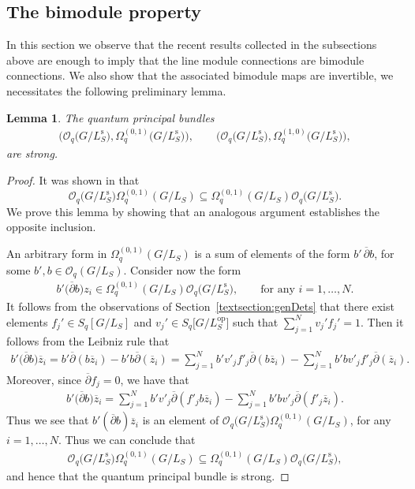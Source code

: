 \documentclass[pdftex]{sigma}
\numberwithin{equation}{section}
\newtheorem{lem}[Theorem]{Lemma}
\newcommand\adel{\overline{\partial}}
\newcommand{\qphs}{\mathcal{O}_q\big(G/L^{\mathrm{s}}_S\big)}
\begin{document}
\subsection{The bimodule property}\label{section3.4}

In this section we observe that the recent results collected in the subsections above are enough to imply that the line module connections are bimodule connections. We also show that the associated bimodule maps are invertible, we necessitates the following preliminary lemma.

\begin{lem}The quantum principal bundles
\begin{gather*}
\big(\mathcal{O}_q\big(G/L_S^{\mathrm{s}}\big),  \Omega^{(0,1)}_q\big(G/L_S^{\mathrm{s}}\big)\big), \qquad \big(\mathcal{O}_q\big(G/L_S^{\mathrm{s}}\big),   \Omega^{(1,0)}_q\big(G/L_S^{\mathrm{s}}\big)\big),
\end{gather*}
are strong.
\end{lem}
\begin{proof}
It was shown in \cite[Lemma 5.7]{CDOBBW} that
\[
\qphs\Omega^{(0,1)}_q(G/L_S) \subseteq \Omega^{(0,1)}_q(G/L_S)\qphs.
\]
We prove this lemma by showing that an analogous argument establishes the opposite inclusion.

An arbitrary form in $\Omega^{(0,1)}_q(G/L_S)$ is a sum of elements of the form $b'\,\adel b$, for some $b',b \in \mathcal{O}_q(G/L_S)$. Consider now the form
\begin{gather*}
b'\big(\adel b\big)z_i \in \Omega^{(0,1)}_q(G/L_S)\qphs , \qquad \textrm{for any } i = 1, \dots, N.
\end{gather*}
It follows from the observations of Section~\ref{textsection:genDets} that there exist elements $f_j'\in S_q[G/L_S]$ and $v_j' \in S_q\big[G/L^{\mathrm{op}}_S\big]$ such that $\sum_{j=1}^N v_j'f_j'=1$. Then it follows from the Leibniz rule that
\begin{gather*}
b'\big(\adel b\big)\overline{z}_i = b'\adel(b\overline{z}_i) - b'b\adel(\overline{z}_i) = \sum_{j=1}^N b'v'_jf'_j\adel(b\overline{z}_i) - \sum_{j=1}^N b'bv'_jf'_j\adel(\overline{z}_i).
\end{gather*}
Moreover, since $\adel f_j = 0$, we have that
\begin{gather*}
b'\big(\adel b\big)\overline{z}_i = \sum_{j=1}^N b'v'_j\adel(f'_jb\overline{z}_i) - \sum_{j=1}^N b'bv'_j\adel(f'_j\overline{z}_i).
\end{gather*}
Thus we see that $b'(\adel b)\overline{z}_i$ is an element of $\qphs\Omega^{(0,1)}_q(G/L_S)$, for any $i = 1, \dots, N$. Thus we can conclude that
\begin{gather*}
\qphs \Omega^{(0,1)}_q(G/L_S) \subseteq \Omega^{(0,1)}_q(G/L_S)\qphs,
\end{gather*}
and hence that the quantum principal bundle is strong.
\end{proof}
\end{document}
